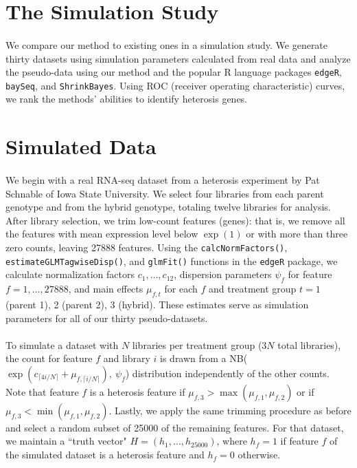 \documentclass{article}
\begin{document}
\begin{flushleft}


\section{The Simulation Study}

\paragraph{} We compare our method to existing ones in a simulation study. We generate thirty datasets using simulation parameters calculated from real data and analyze the pseudo-data using our method and the popular R language packages {\tt edgeR}, {\tt baySeq}, and {\tt ShrinkBayes}. Using ROC (receiver operating characteristic) curves, we rank the methods' abilities to identify heterosis genes.

\section{Simulated Data}

\paragraph{} {\color{red} We begin with a real RNA-seq dataset from a heterosis experiment by Pat Schnable of Iowa State University. We select four libraries from each parent genotype and from the hybrid genotype, totaling twelve libraries for analysis.} After library selection, we trim low-count features (genes): that is, we remove all the features with mean expression level below $\exp(1)$ or with more than three zero counts, leaving 27888 features. Using the {\tt calcNormFactors()}, {\tt estimateGLMTagwiseDisp()}, and {\tt glmFit()} functions in the {\tt edgeR} package, we calculate normalization factors $c_1, \ldots, c_{12}$, dispersion parameters $\psi_{f}$ for feature $f = 1, \ldots, 27888$, and main effects $\mu_{f, t}$ for each $f$ and treatment group $t = 1$ (parent 1), 2 (parent 2), 3 (hybrid). These estimates serve as simulation parameters for all of our thirty pseudo-datasets.

\paragraph{} To simulate a dataset with $N$ libraries per treatment group ($3N$ total libraries), the count for feature $f$ and library $i$ is drawn from a NB($\exp(c_{\lceil 4i/N \rceil} + \mu_{f, \lceil i/N \rceil}), \ \psi_f$) distribution independently of the other counts. Note that feature $f$ is a heterosis feature if $\mu_{f, 3} > \max(\mu_{f, 1}, \mu_{f, 2})$ or if $\mu_{f, 3} < \min(\mu_{f, 1}, \mu_{f, 2})$. Lastly, we apply the same trimming procedure as before and select a random subset of 25000 of the remaining features. For that dataset, we maintain a ``truth vector" $H = (h_1, \ldots, h_{25000})$, where $h_f = 1$ if feature $f$ of the simulated dataset is a heterosis feature and $h_f = 0$ otherwise.


\end{flushleft}
\end{document}
